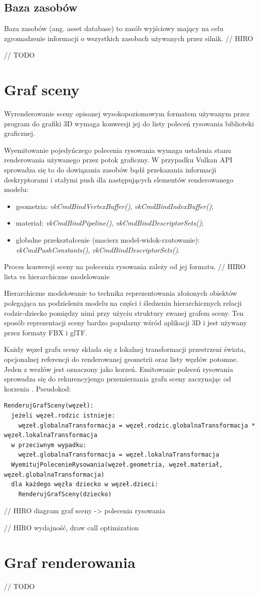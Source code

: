 \subsection{Baza zasobów}
Baza zasobów (ang. asset database) to zasób wyjściowy mający na celu zgromadzenie informacji o wszystkich zasobach używanych przez silnik.
// HIRO



// TODO

\section{Graf sceny}

Wyrenderowanie sceny opisanej wysokopoziomowym formatem używanym przez program do grafiki 3D wymaga konwersji jej do listy poleceń rysowania biblioteki graficznej.

Wyemitowanie pojedyńczego polecenia rysowania wymaga ustalenia stanu renderowania używanego przez potok graficzny. W przypadku Vulkan API sprowadza się to do dowiązania zasobów bądź przekazania informacji deskryptorami i stałymi push dla następujących elementów renderowanego modelu:
\begin{itemize}
	\item geometria: \textit{vkCmdBindVertexBuffer()}, \textit{vkCmdBindIndexBuffer()};
	\item materiał: \textit{vkCmdBindPipeline()}, \textit{vkCmdBindDescriptorSets()};
	\item globalne przekształcenie (macierz model-widok-rzutowanie): \textit{vkCmdPushConstants()}, \textit{vkCmdBindDescriptorSets()}.
\end{itemize}

Proces konwersji sceny na polecenia rysowania zależy od jej formatu.
// HIRO lista vs hierarchiczne modelowanie

Hierarchiczne modelowanie to technika reprezentowania złożonych obiektów polegająca na podzieleniu modelu na części i śledzeniu hierarchicznych relacji rodzic-dziecko pomiędzy nimi przy użyciu struktury zwanej grafem sceny. Ten sposób reprezentacji sceny bardzo popularny wśród aplikacji 3D i jest używany przez formaty FBX i glTF.

Każdy węzeł grafu sceny składa się z lokalnej transformacji przestrzeni świata, opcjonalnej referencji do renderowanej geometrii oraz listy węzłów potomne. Jeden z wezłów jest oznaczony jako korzeń.
Emitowanie poleceń rysowania sprowadza się do rekurencyjengo przemierzania grafu sceny zaczynając od korzenia \cite{kosarevsky20213d}.
Pseudokod:
\begin{verbatim}
RenderujGrafSceny(węzeł):
  jeżeli węzeł.rodzic istnieje:
    węzeł.globalnaTransformacja = węzeł.rodzic.globalnaTransformacja * węzeł.lokalnaTransformacja
  w przeciwnym wypadku:
    węzeł.globalnaTransformacja = węzeł.lokalnaTransformacja
  WyemitujPolecenieRysowania(węzeł.geometria, węzeł.materiał, węzeł.globalnaTransformacja)
  dla każdego węzła dziecko w węzeł.dzieci:
    RenderujGrafSceny(dziecko)
\end{verbatim}

// HIRO diagram graf sceny -> polecenia rysowania

// HIRO wydajność, draw call optimization

\section{Graf renderowania}

// TODO
